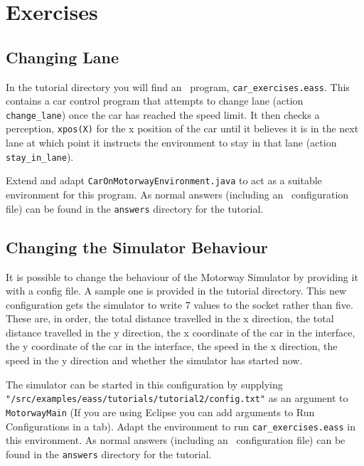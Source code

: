 \section{Exercises}
\subsection{Changing Lane}
In the tutorial directory you will find an \eass\ program, \texttt{car\_exercises.eass}.  This contains a car control program that attempts to change lane (action \lstinline{change_lane}) once the car has reached the speed limit.  It then checks a perception, \lstinline{xpos(X)} for the x position of the car until it believes it is in the next lane at which point it instructs the environment to stay in that lane (action \lstinline{stay_in_lane}). 

Extend and adapt \texttt{CarOnMotorwayEnvironment.java} to act as a suitable environment for this program.  As normal answers (including an \ail\ configuration file) can be found in the \texttt{answers} directory for the tutorial.

\subsection{Changing the Simulator Behaviour}
It is possible to change the behaviour of the Motorway Simulator by providing it with a config file.  A sample one is provided in the tutorial directory.  This new configuration gets the simulator to write 7 values to the socket rather than five.  These are, in order, the total distance travelled in the x direction, the total distance travelled in the y direction, the x coordinate of the car in the interface, the y coordinate of the car in the interface, the speed in the x direction, the speed in the y direction and whether the simulator has started now.

\begin{sloppypar}
The simulator can be started in this configuration by supplying \texttt{"/src/examples/eass/tutorials/tutorial2/config.txt"} as an argument to \texttt{MotorwayMain} (If you are using Eclipse you can add arguments to Run Configurations in a tab).  Adapt the environment to run \texttt{car\_exercises.eass} in this environment.  As normal answers (including an \ail\ configuration file) can be found in the \texttt{answers} directory for the tutorial.
\end{sloppypar}
